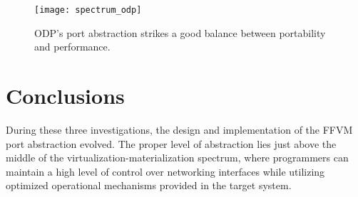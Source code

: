 \begin{figure}[h!]
  \centering
  \texttt{[image: spectrum\_odp]}
  \caption{ODP's port abstraction strikes a good balance between portability
  and performance.}
  \label{hardware:spectrum_odp}
\end{figure}

\section{Conclusions}
\label{hardware:concl}
During these three investigations, the design and implementation of the FFVM
port abstraction evolved. The proper level of abstraction lies just above the
middle of the virtualization-materialization spectrum, where programmers can
maintain a high level of control over networking interfaces while utilizing
optimized operational mechanisms provided in the target system.


